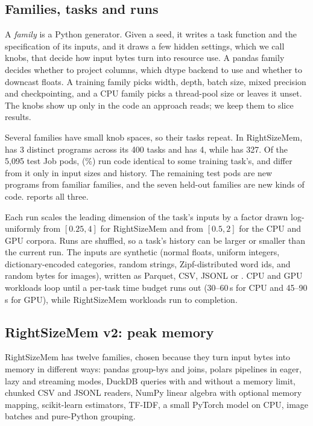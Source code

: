 \subsection{Families, tasks and runs}
A \emph{family} is a Python generator. Given a seed, it writes a task function and the specification of its
inputs, and it draws a few hidden settings, which we call knobs, that decide how input bytes turn into resource
use. A pandas family decides whether to project columns, which dtype backend to use and whether to downcast
floats. A training family picks width, depth, batch size, mixed precision and checkpointing, and a CPU family
picks a thread-pool size or leaves it unset. The knobs show up only in the code an approach reads; we keep them
to slice results.

Several families have small knob spaces, so their tasks repeat. In RightSizeMem,  has 3
distinct programs across its 400 tasks and  has 4, while  has 327. Of
the 5,095 test Job pods, \codeSeenN{} (\codeSeenShare\%) run code identical to some training task's, and differ
from it only in input sizes and history. The remaining \codeNovelN{} test pods are new programs from familiar
families, and the seven held-out families are new kinds of code.  reports all three.

Each run scales the leading dimension of the task's inputs by a factor drawn log-uniformly from $[0.25, 4]$ for
RightSizeMem and from $[0.5, 2]$ for the CPU and GPU corpora. Runs are shuffled, so a task's history can be
larger or smaller than the current run. The inputs are synthetic (normal floats, uniform integers,
dictionary-encoded categories, random strings, Zipf-distributed word ids, and random bytes for images), written
as Parquet, CSV, JSONL or . CPU and GPU workloads loop until a per-task time budget runs out
(30--60\,s for CPU and 45--90\,s for GPU), while RightSizeMem workloads run to completion.

\subsection{RightSizeMem v2: peak memory}
RightSizeMem has twelve families, chosen because they turn input bytes into memory in different ways: pandas
group-bys and joins, polars pipelines in eager, lazy and streaming modes, DuckDB queries with and without a
memory limit, chunked CSV and JSONL readers, NumPy linear algebra with optional memory mapping, scikit-learn
estimators, TF-IDF, a small PyTorch model on CPU, image batches and pure-Python grouping.

